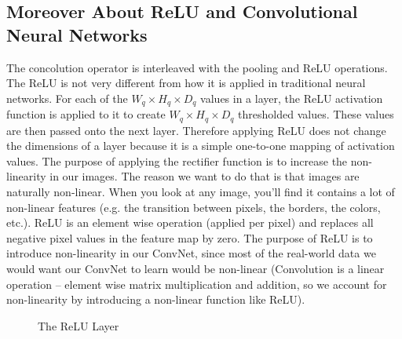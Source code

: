 \documentclass[11pt]{article}
\begin{document}
\subsection{Moreover About ReLU and Convolutional Neural Networks}
\hspace*{1cm} The concolution operator is interleaved with the pooling and ReLU operations. The ReLU is not very different from how it is applied in traditional neural networks. For each of the $W_q \times H_q \times D_q$ values in a layer, the ReLU activation function is applied to it to create $W_q \times H_q \times D_q$ thresholded values. These values are then passed onto the next layer. Therefore applying ReLU does not change the dimensions of a layer because it is a simple one-to-one mapping of activation values. The purpose of applying the rectifier function is to increase the non-linearity in our images. The reason we want to do that is that images are naturally non-linear. When you look at any image, you'll find it contains a lot of non-linear features (e.g. the transition between pixels, the borders, the colors, etc.). ReLU is an element wise operation (applied per pixel) and replaces all negative pixel values in the feature map by zero. The purpose of ReLU is to introduce non-linearity in our ConvNet, since most of the real-world data we would want our ConvNet to learn would be non-linear (Convolution is a linear operation – element wise matrix multiplication and addition, so we account for non-linearity by introducing a non-linear function like ReLU).	
\begin{figure}[H]
    \centering
    \qquad
    \caption{The ReLU Layer}%
    \label{fig:example}
\end{figure}
\end{document}

